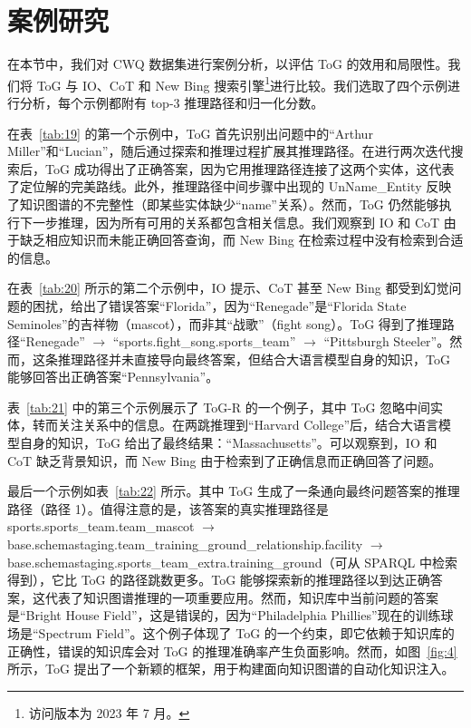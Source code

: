 \documentclass[11pt,UTF8,fontset=fandol]{ctexart}
\begin{document}
\section{案例研究}

在本节中，我们对 CWQ 数据集进行案例分析，以评估 ToG 的效用和局限性。我们将 ToG 与 IO、CoT 和 New Bing 搜索引擎\footnote{访问版本为 2023 年 7 月。}进行比较。我们选取了四个示例进行分析，每个示例都附有 top-3 推理路径和归一化分数。

在表~\ref{tab:19} 的第一个示例中，ToG 首先识别出问题中的“Arthur Miller”和“Lucian”，随后通过探索和推理过程扩展其推理路径。在进行两次迭代搜索后，ToG 成功得出了正确答案，因为它用推理路径连接了这两个实体，这代表了定位解的完美路线。此外，推理路径中间步骤中出现的 UnName\_Entity 反映了知识图谱的不完整性（即某些实体缺少“name”关系）。然而，ToG 仍然能够执行下一步推理，因为所有可用的关系都包含相关信息。我们观察到 IO 和 CoT 由于缺乏相应知识而未能正确回答查询，而 New Bing 在检索过程中没有检索到合适的信息。

在表~\ref{tab:20} 所示的第二个示例中，IO 提示、CoT 甚至 New Bing 都受到幻觉问题的困扰，给出了错误答案“Florida”，因为“Renegade”是“Florida State Seminoles”的吉祥物（mascot），而非其“战歌”（fight song）。ToG 得到了推理路径“Renegade” $\rightarrow$ “sports.fight\_song.sports\_team” $\rightarrow$ “Pittsburgh Steeler”。然而，这条推理路径并未直接导向最终答案，但结合大语言模型自身的知识，ToG 能够回答出正确答案“Pennsylvania”。

表~\ref{tab:21} 中的第三个示例展示了 ToG-R 的一个例子，其中 ToG 忽略中间实体，转而关注关系中的信息。在两跳推理到“Harvard College”后，结合大语言模型自身的知识，ToG 给出了最终结果：“Massachusetts”。可以观察到，IO 和 CoT 缺乏背景知识，而 New Bing 由于检索到了正确信息而正确回答了问题。

最后一个示例如表~\ref{tab:22} 所示。其中 ToG 生成了一条通向最终问题答案的推理路径（路径 1）。值得注意的是，该答案的真实推理路径是 sports.\allowbreak sports\_team.\allowbreak team\_mascot $\rightarrow$ base.\allowbreak schemastaging.\allowbreak team\_training\_ground\_relationship.\allowbreak facility $\rightarrow$ base.\allowbreak schemastaging.\allowbreak sports\_team\_extra.\allowbreak training\_ground（可从 SPARQL 中检索得到），它比 ToG 的路径跳数更多。ToG 能够探索新的推理路径以到达正确答案，这代表了知识图谱推理的一项重要应用。然而，知识库中当前问题的答案是“Bright House Field”，这是错误的，因为“Philadelphia Phillies”现在的训练球场是“Spectrum Field”。这个例子体现了 ToG 的一个约束，即它依赖于知识库的正确性，错误的知识库会对 ToG 的推理准确率产生负面影响。然而，如图~\ref{fig:4} 所示，ToG 提出了一个新颖的框架，用于构建面向知识图谱的自动化知识注入。
\end{document}
